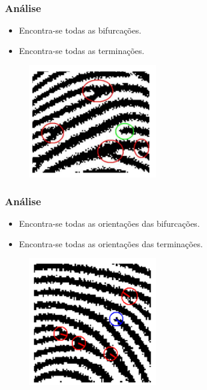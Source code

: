 \documentclass{beamer}
\begin{document}

\begin{frame}
\frametitle{Análise}
		
		\begin{itemize}
			\item Encontra-se todas as bifurcações.
			\item Encontra-se todas as terminações.
		\end{itemize}

	\begin{figure}[!h]
		\begin{center}
			\includegraphics[width=0.5\textwidth]{Figures/features}
		\end{center}
		
	\end{figure}
	
\end{frame}


\begin{frame}
\frametitle{Análise}
		
		\begin{itemize}
			\item Encontra-se todas as orientações das bifurcações.
			\item Encontra-se todas as orientações das terminações.
		\end{itemize}

	\begin{figure}[!h]
		\begin{center}
			\includegraphics[width=0.5\textwidth]{Figures/orientacoes}
		\end{center}
		
	\end{figure}
	
\end{frame}
\end{document}
